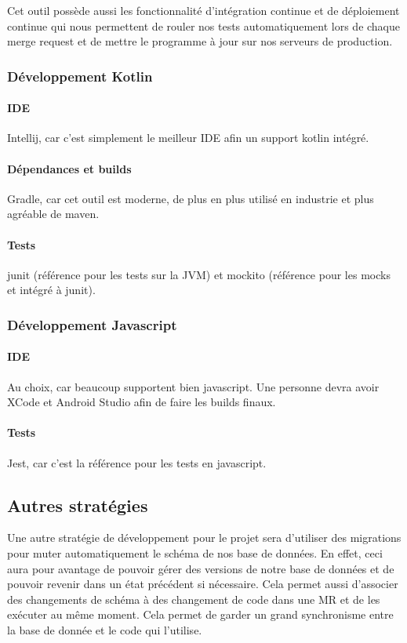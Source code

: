 		Cet outil possède aussi les fonctionnalité d’intégration continue et de déploiement continue qui nous permettent de rouler nos tests automatiquement lors de chaque merge request et de mettre le programme à jour sur nos serveurs de production.

		\subsubsection{Développement Kotlin}
		\paragraph{IDE} Intellij, car c’est simplement le meilleur IDE afin un support kotlin intégré.
		\paragraph{Dépendances et builds} Gradle, car cet outil est moderne, de plus en plus utilisé en industrie et plus agréable de maven.
		\paragraph{Tests} junit (référence pour les tests sur la JVM) et mockito (référence pour les mocks et intégré à junit).

		\subsubsection{Développement Javascript}
		\paragraph{IDE} Au choix, car beaucoup supportent bien javascript. Une personne devra avoir XCode et Android Studio afin de faire les builds finaux. 
		\paragraph{Tests} Jest, car c’est la référence pour les tests en javascript.
		
	\subsection{Autres stratégies}
	Une autre stratégie de développement pour le projet sera d’utiliser des migrations pour muter automatiquement le schéma de nos base de données. En effet, ceci aura pour avantage de pouvoir gérer des versions de notre base de données et de pouvoir revenir dans un état précédent si nécessaire. Cela permet aussi d’associer des changements de schéma à des changement de code dans une MR et de les exécuter au même moment. Cela permet de garder un grand synchronisme entre la base de donnée et le code qui l’utilise. 

